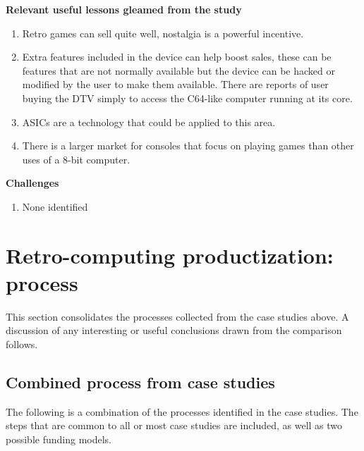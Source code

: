 \textbf{Relevant useful lessons gleamed from the study}\\
\begin{enumerate}
\item Retro games can sell quite well, nostalgia is a powerful incentive.
\item Extra features included in the device can help boost sales, these can be features that are not normally available but the device can be hacked or modified by the user to make them available. There are reports of user buying the DTV simply to access the C64-like computer running at its core.
\item ASICs are a technology that could be applied to this area.
\item There is a larger market for consoles that focus on playing games than other uses of a 8-bit computer.
\end{enumerate}

\textbf{Challenges}
\begin{enumerate}
\item None identified
\end{enumerate}

\section{Retro-computing productization: process}
\label{sec: Retro-computing process}
This section consolidates the processes collected from the case studies above. A discussion of any interesting or useful conclusions drawn from the comparison follows.\\

\subsection{Combined process from case studies}
The following is a combination of the processes identified in the case studies. The steps that are common to all or most case studies are included, as well as two possible funding models.\\

